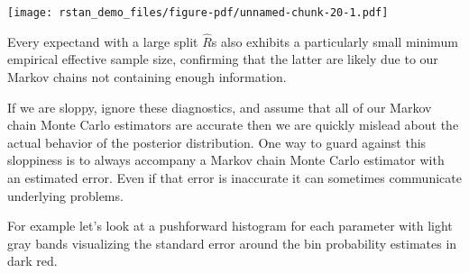 \documentclass[
  letterpaper,
  DIV=11,
  numbers=noendperiod]{scrartcl}
\newenvironment{Shaded}{\begin{snugshade}}{\end{snugshade}}
\newcommand{\AttributeTok}[1]{\textcolor[rgb]{0.40,0.45,0.13}{#1}}
\newcommand{\DecValTok}[1]{\textcolor[rgb]{0.68,0.00,0.00}{#1}}
\newcommand{\FunctionTok}[1]{\textcolor[rgb]{0.28,0.35,0.67}{#1}}
\newcommand{\NormalTok}[1]{\textcolor[rgb]{0.00,0.23,0.31}{#1}}
\newcommand{\SpecialCharTok}[1]{\textcolor[rgb]{0.37,0.37,0.37}{#1}}
\newcommand{\StringTok}[1]{\textcolor[rgb]{0.13,0.47,0.30}{#1}}
\begin{document}
\texttt{[image: rstan\_demo\_files/figure-pdf/unnamed-chunk-20-1.pdf]}

Every expectand with a large split \(\hat{R}\)s also exhibits a
particularly small minimum empirical effective sample size, confirming
that the latter are likely due to our Markov chains not containing
enough information.

If we are sloppy, ignore these diagnostics, and assume that all of our
Markov chain Monte Carlo estimators are accurate then we are quickly
mislead about the actual behavior of the posterior distribution. One way
to guard against this sloppiness is to always accompany a Markov chain
Monte Carlo estimator with an estimated error. Even if that error is
inaccurate it can sometimes communicate underlying problems.

For example let's look at a pushforward histogram for each parameter
with light gray bands visualizing the standard error around the bin
probability estimates in dark red.

\begin{Shaded}
\end{Shaded}
\end{document}
